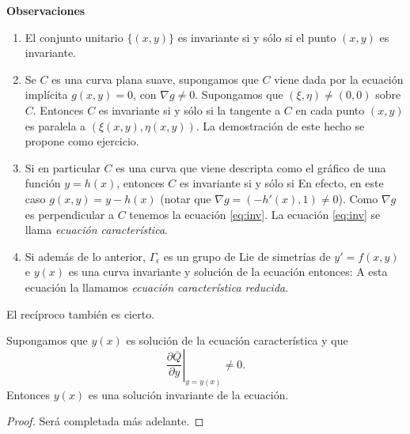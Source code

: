 \noindent\textbf{Observaciones}
\begin{enumerate}
\item El conjunto unitario $\{(x,y)\}$ es invariante si y sólo si el punto $(x,y)$ 
es invariante.

\item Se $C$ es una curva plana suave, supongamos que $C$ viene dada por la ecuación implícita $g(x,y)=0$, con $\nabla g\neq 0$.  Supongamos que  $(\xi,\eta)\neq (0,0)$ sobre $C$. Entonces $C$ es invariante si y sólo si la tangente a  $C$ en cada punto $(x,y)$ es
paralela a $(\xi(x,y),\eta(x,y))$. La demostración de este hecho se propone como ejercicio. \actividad
\item Si en particular $C$ es una curva que viene descripta como el gráfico de una función $y=h(x)$, entonces $C$ es invariante si y sólo si
En efecto, en este caso $g(x,y)=y-h(x)$ (notar que $\nabla g=(-h'(x),1)\neq 0$). Como $\nabla g$ es perpendicular a $C$ tenemos la ecuación \eqref{eq:inv}. La ecuación \eqref{eq:inv} se llama \emph{ecuación característica}.





\item Si además de lo anterior, $\Gamma_{\epsilon}$ es un grupo de Lie de simetrías de $y'=f(x,y)$ e $y(x)$ es una curva invariante y solución de la ecuación entonces:
A esta ecuación la llamamos  \emph{ecuación característica reducida}.

 \end{enumerate}


El recíproco también es cierto.
\begin{teorema}\label{teo:invariantes}
 Supongamos que $y(x)$ es solución de la ecuación característica y que
 \[\left.\frac{\partial \overline{Q}}{\partial y}\right|_{y=y(x)}\neq 0.\]
 Entonces $y(x)$ es una solución invariante de la ecuación.
\end{teorema}
\begin{proof} Será completada más adelante.
 
\end{proof}




